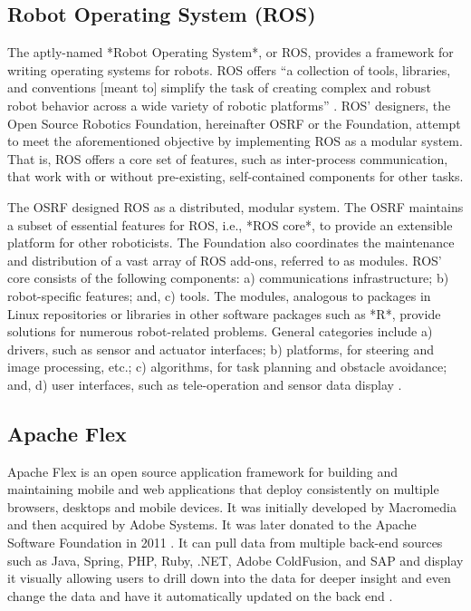 \subsection{Robot Operating System (ROS)}

     The aptly-named *Robot Operating System*, or ROS, provides a
     framework for writing operating systems for robots.  ROS offers ``a 
     collection of tools, libraries, and conventions [meant to] simplify the 
     task of creating complex and robust robot behavior across a wide variety 
     of robotic platforms'' \cite{www-ros-about}. ROS' designers, the Open 
     Source Robotics Foundation, hereinafter OSRF or the Foundation, attempt 
     to meet the aforementioned objective by implementing ROS as a modular 
     system.  That is, ROS offers a core set of features, such as 
     inter-process communication, that work with or without pre-existing, 
     self-contained components for other tasks.

     The OSRF designed ROS as a distributed, modular system.  The OSRF 
     maintains a subset of essential features for ROS, i.e., *ROS 
     core*, to provide an extensible platform for other roboticists.  The 
     Foundation also coordinates the maintenance and distribution of a vast 
     array of ROS add-ons, referred to as modules.  ROS' core consists of the 
     following components: a) communications infrastructure; b) robot-specific 
     features; and, c) tools.  The modules, analogous to packages in Linux 
     repositories or libraries in other software packages such as *R*, 
     provide solutions for numerous robot-related problems.  General 
     categories include a) drivers, such as sensor and actuator interfaces; b) 
     platforms, for steering and image processing, etc.; c) algorithms, for 
     task planning and obstacle avoidance; and, d) user interfaces, such as 
     tele-operation and sensor data display \cite{www-software-categories}.


\subsection{Apache Flex}

     Apache Flex \cite{www-flex} is an open source application
     framework for building and maintaining mobile and web
     applications that deploy consistently on multiple browsers,
     desktops and mobile devices. It was initially developed by
     Macromedia and then acquired by Adobe Systems. It was later
     donated to the Apache Software Foundation in 2011
     \cite{blog-flex}. It can pull data from multiple back-end
     sources such as Java, Spring, PHP, Ruby, .NET, Adobe ColdFusion,
     and SAP and display it visually allowing users to drill down into
     the data for deeper insight and even change the data and have it
     automatically updated on the back end \cite{wiki-flex}.


